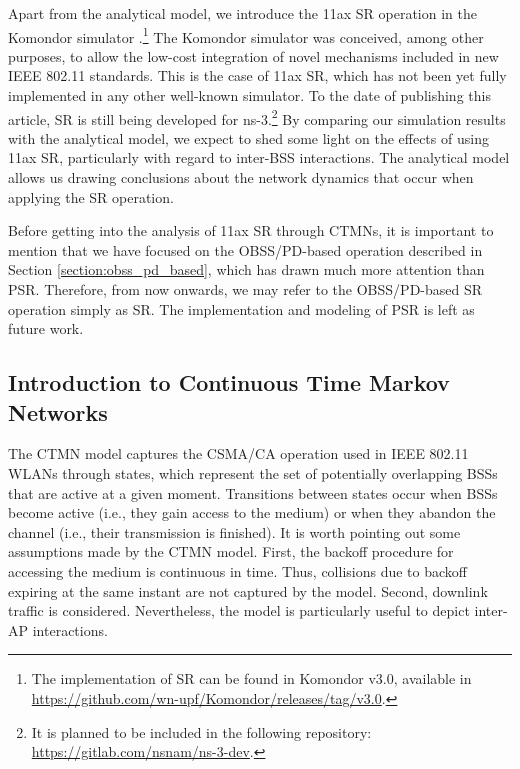 \documentclass{ieeeaccess}
\begin{document}
Apart from the analytical model, we introduce the 11ax SR operation in the Komondor simulator \cite{barrachina2019komondor}.\footnote{The implementation of SR can be found in Komondor v3.0, available in \url{https://github.com/wn-upf/Komondor/releases/tag/v3.0}.} The Komondor simulator was conceived, among other purposes, to allow the low-cost integration of novel mechanisms included in new IEEE 802.11 standards. This is the case of 11ax SR, which has not been yet fully implemented in any other well-known simulator. To the date of publishing this article, SR is still being developed for ns-3.\footnote{It is planned to be included in the following repository: \url{https://gitlab.com/nsnam/ns-3-dev}.} By comparing our simulation results with the analytical model, we expect to shed some light on the effects of using 11ax SR, particularly with regard to inter-BSS interactions. The analytical model allows us drawing conclusions about the network dynamics that occur when applying the SR operation.

Before getting into the analysis of 11ax SR through CTMNs, it is important to mention that we have focused on the OBSS/PD-based operation described in Section \ref{section:obss_pd_based}, which has drawn much more attention than PSR. Therefore, from now onwards, we may refer to the OBSS/PD-based SR operation simply as SR. The implementation and modeling of PSR is left as future work.%

\subsection{Introduction to Continuous Time Markov Networks}
The CTMN model captures the CSMA/CA operation used in IEEE 802.11 WLANs through states, which represent the set of potentially overlapping BSSs that are active at a given moment. Transitions between states occur when BSSs become active (i.e., they gain access to the medium) or when they abandon the channel (i.e., their transmission is finished). It is worth pointing out some assumptions made by the CTMN model. First, the backoff procedure for accessing the medium is continuous in time. Thus, collisions due to backoff expiring at the same instant are not captured by the model. Second, downlink traffic is considered. Nevertheless, the model is particularly useful to depict inter-AP interactions.
\end{document}
